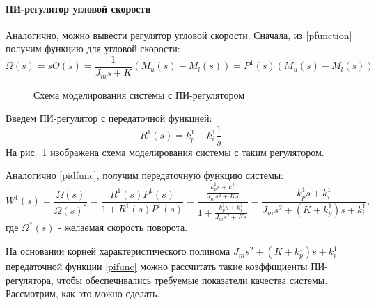 \paragraph*{ПИ-регулятор угловой скорости\\}
\hspace*{\parindent}Аналогично, можно вывести регулятор угловой скорости. Сначала, из \eqref{pfunction} получим функцию для угловой скорости:
\begin{equation}
	\Omega(s)=s\Theta(s)=\frac{1}{J_ms+K}(M_u(s)-M_l(s))=P^1(s)(M_u(s)-M_l(s))
\end{equation}

\begin{figure}[h]
	\noindent{}
	\caption{Схема моделирования системы с ПИ-регулятором}
	\label{pi}
\end{figure}

Введем ПИ-регулятор с передаточной функцией:
\begin{equation}
	R^1(s)=k_p^1+k_i^1\frac{1}{s}
\end{equation}
На рис.~\ref{pi} изображена схема моделирования системы с таким регулятором.

Аналогично \eqref{pidfunc}, получим передаточную функцию системы:
\begin{equation}\label{pifunc}
	W^1(s)=\frac{\Omega(s)}{\Omega(s)^*}=\frac{R^1(s)P^1(s)}{1+R^1(s)P^1(s)}=\frac{\frac{k_p^1s+k_i^1}{J_ms^2+Ks}}{1+\frac{k_p^1s+k_i^1}{J_ms^2+Ks}}=\frac{k_p^1s+k_i^1}{J_ms^2+(K+k_p^1)s+k_i^1},
\end{equation}
где $\Omega^*(s)$ - желаемая скорость поворота.

На основании корней характеристического полинома $J_ms^2+(K+k_p^1)s+k_i^1$ передаточной функции \eqref{pifunc} можно рассчитать такие коэффициенты ПИ-регулятора, чтобы обеспечивались требуемые показатели качества системы. Рассмотрим, как это можно сделать. 
